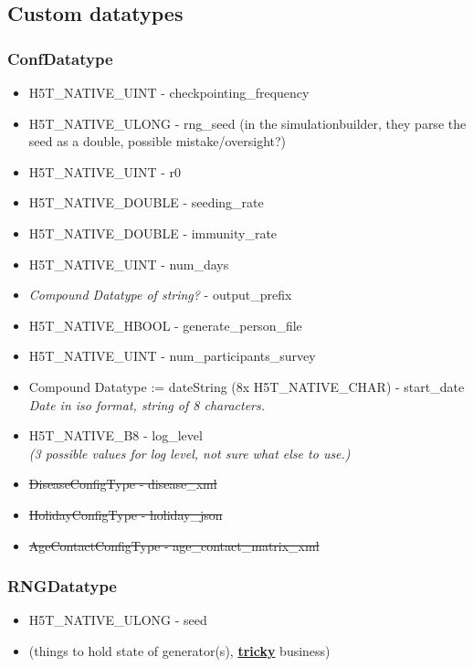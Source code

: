 \documentclass{article}
\begin{document}
		\subsection{Custom datatypes}
			\subsubsection{ConfDatatype}
				\begin{itemize}
					\item H5T\_NATIVE\_UINT - checkpointing\_frequency
					\item H5T\_NATIVE\_ULONG - rng\_seed (in the simulationbuilder, they parse the seed as a double, possible mistake/oversight?)
					\item H5T\_NATIVE\_UINT - r0
					\item H5T\_NATIVE\_DOUBLE - seeding\_rate
					\item H5T\_NATIVE\_DOUBLE - immunity\_rate
					\item H5T\_NATIVE\_UINT - num\_days
					\item \textit{Compound Datatype of string?} - output\_prefix
					\item H5T\_NATIVE\_HBOOL - generate\_person\_file
					\item H5T\_NATIVE\_UINT - num\_participants\_survey
					\item Compound Datatype := dateString (8x H5T\_NATIVE\_CHAR) - start\_date
						\\ \textit{Date in iso format, string of 8 characters.}
					\item H5T\_NATIVE\_B8 - log\_level 
						\\ \textit{(3 possible values for log level, not sure what else to use.)} \\
					
					\item  \sout{DiseaseConfigType - disease\_xml} 
					\item  \sout{HolidayConfigType - holiday\_json} 
					\item  \sout{AgeContactConfigType - age\_contact\_matrix\_xml}
				\end{itemize}

			\subsubsection{RNGDatatype}
				\begin{itemize}
					\item H5T\_NATIVE\_ULONG - seed
					\item (things to hold state of generator(s), \textbf{\underline{tricky}} business)
				\end{itemize}
\end{document}
